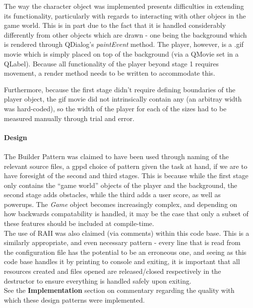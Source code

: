 \documentclass[11pt]{article}
\begin{document}
The way the character object was implemented presents difficulties in extending its functionality, particularly with regards to interacting with other objecs in the game world. This is in part due to the fact that it is handled considerably differently from other objects which are drawn - one being the background which is rendered through QDialog's \textit{paintEvent} method. The player, however, is a .gif movie which is simply placed on top of the background (via a QMovie set in a QLabel). Because all functionality of the player beyond stage 1 requires movement, a render method needs to be written to accommodate this. 

Furthermore, because the first stage didn't require defining boundaries of the player object, the gif movie did not intrinsically contain any (an arbitray width was hard-coded), so the width of the player for each of the sizes had to be measured manually through trial and error.\\\\

{\large\textbf{Design}}\\\\
The Builder Pattern was claimed to have been used through naming of the relevant source files, a gppd choice of pattern given the task at hand, if we are to have foresight of the second and third stages. This is because while the first stage only contains the ``game world'' objects of the player and the background, the second stage adds obstacles, while the third adds a user score, as well as powerups. The \textit{Game} object becomes increasingly complex, and depending on how backwards compatability is handled, it may be the case that only a subset of these features should be included at compile-time.\\

The use of RAII was also claimed (via comments) within this code base. This is a similarly appropriate, and even necessary pattern - every line that is read from the configuration file has the potential to be an erroneous one, and seeing as this code base handles it by printing to console and exiting, it is important that all resources created and files opened are released/closed respectively in the destructor to ensure everything is handled safely upon exiting.\\

See the \textbf{Implementation} section on commentary regarding the quality with which these design patterns were implemented.\\\\
\end{document}
